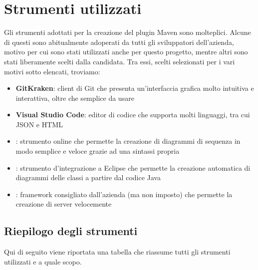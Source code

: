\section{Strumenti utilizzati}
Gli strumenti adottati per la creazione del plugin Maven sono molteplici.
Alcune di questi sono abitualmente adoperati da tutti gli sviluppatori dell'azienda, motivo per cui sono stati utilizzati anche per questo progetto, mentre altri sono stati liberamente scelti dalla candidata.
Tra essi, scelti selezionati per i vari motivi sotto elencati, troviamo:
\begin{itemize}
    \item \textbf{GitKraken}: client di Git che presenta un'interfaccia grafica molto intuitiva e interattiva, oltre che semplice da usare
    \item \textbf{Visual Studio Code}: editor di codice che supporta molti linguaggi, tra cui JSON e HTML
    \item {}: strumento online che permette la creazione di diagrammi di sequenza in modo semplice e veloce grazie ad una sintassi propria
    \item {}: strumento d'integrazione a Eclipse che permette la creazione automatica di diagrammi delle classi a partire dal codice Java
    \item {}: framework consigliato dall'azienda (ma non imposto) che permette la creazione di server velocemente
\end{itemize}


    \subsection{Riepilogo degli strumenti}

    Qui di seguito viene riportata una tabella che riassume tutti gli strumenti utilizzati e a quale scopo.

